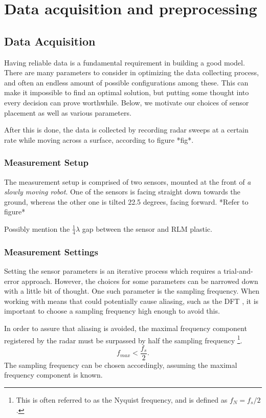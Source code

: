 \chapter{Data acquisition and preprocessing}
\section{Data Acquisition}
Having reliable data is a fundamental requirement in building a good model. There are many parameters to consider in optimizing the data collecting process, and often an endless amount of possible configurations among these. This can make it impossible to find an optimal solution, but putting some thought into every decision can prove worthwhile. Below, we motivate our choices of sensor placement as well as various parameters.

After this is done, the data is collected by recording radar sweeps at a certain rate while moving across a surface, according to figure *fig*.

\subsection{Measurement Setup}
The measurement setup is comprised of two sensors, mounted at the front of \emph{a slowly moving robot}. One of the sensors is facing straight down towards the ground, whereas the other one is tilted 22.5 degrees, facing forward. *Refer to figure*

Possibly mention the $\frac14\lambda$ gap between the sensor and RLM plastic.


\subsection{Measurement Settings}
Setting the sensor parameters is an iterative process which requires a trial-and-error approach. However, the choices for some parameters can be narrowed down with a little bit of thought. One such parameter is the sampling frequency. When working with means that could potentially cause aliasing, such as the DFT \citep{lindgren_rootzeŽn_sandsten_2013}, it is important to choose a sampling frequency high enough to avoid this.

In order to assure that aliasing is avoided, the maximal frequency component registered by the radar must be surpassed by half the sampling frequency \footnote{This is often referred to as the Nyquist frequency, and is defined as $f_N=f_s/2$.}.
\begin{equation}
\label{eq:nyquist}
	f_{max} < \frac{f_s}2.
\end{equation}
The sampling frequency can be chosen accordingly, assuming the maximal frequency component is known. 

